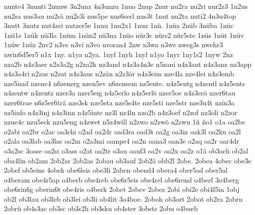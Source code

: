 {    nunte4
    3nunti
    2nunw
    3n2unz
    4n3unzu
    1nuo
    2nup
    2nur
    nu2ra
    nu2ri
    nur2z3
    1n2us
    nu2sa
    nus3au
    nu2sä
    nu2s3i
    nus5pe
    nus6serl
    nus3t
    1nut
    nu2ta
    nuti2
    4n3u4top
    3nutt
    3nutz
    nut4zei
    nutzer5e
    1nuu
    1nu2x1
    1nuz
    1nü.
    1nüa
    2nüb
    3nüba
    1nüc
    1nü1e
    1nük
    nü3la
    1nüm
    1nün2
    nü3na
    1nüo
    nür3c
    nürs2
    nür5ste
    1nüs
    1nüt
    1nüv
    1nüw
    1nüz
    2nv2
    n3ve
    n3vi
    n3vo
    nvoran4
    2nw
    n3wa
    n3we
    nweg3s
    nwehr3
    nwin6d5er5
    n1x
    1ny.
    n1ya
    n2ya.
    1nyf
    1nyh
    1nyl
    n1yo
    1nyr
    1ny1s2
    1nyw
    2nz
    nza2b
    n4z3aer
    n2z3a2g
    n2za2k
    nz3and
    n4z3a4n3e
    n5zani
    n4z3ant
    n4z3anz
    nz3app
    n4z3a4ri
    n2zas
    n2zat
    n4z3aus
    n2zän
    n2z3är
    n4z3eim
    nze4la
    nze4lei
    n4z3emb
    nze5nad
    nzene4
    n6zenerg
    nzen5ev
    n6zensem
    nz5ente.
    n4z5entg
    n4zentl
    n4z5ents
    n4zentw
    n4zentz
    nzer3a
    nzer5eig
    n4z5erlo
    n4z5erlö
    nzer5oe
    n4z3erö
    nzer6tau
    nzer6trae
    n6z5er6trä
    nze3sk
    nze5sta
    nze5s4te
    nze5sti
    nze5str
    nze3u4t
    nzin3a
    nz5info
    n4z3inj
    n4z3inn
    n4z5inte
    nz3l
    nz4ln
    nzo2b
    n4z3oef
    n2zof
    nz3oli
    n2zor
    nzue4c
    nzu5eck
    nzu5eng
    n4zwet
    n5z4will
    n2zwo
    n2zwö
    n2zwu
    1ñ
    ño1
    o1a
    oa2be
    o2abi
    oa2br
    o2ac
    oa3chi
    o2ad
    oa2dr
    oad3ra
    oad3t
    oa2g
    oa3in
    oak3l
    oa2ku
    oa2l
    o2ala
    oa3lab
    oa3las
    oa2m
    o2a3mi
    oampe4
    oa2n
    oana3
    oan3e
    o2aq
    oa2r
    oar4dr
    o3a2sc
    3oase
    oa2si
    o3ass
    o2at
    oa2tr
    o3au
    oauf3
    oa2v
    oa2x
    oa2z
    o1ä
    ob3ach
    ob2al
    oba4lin
    ob2am
    2ob2ar
    2ob2as
    2obau
    ob3auf
    2ob2ä
    obb2l
    2obe.
    2obea
    4obec
    obe3e
    2obef
    ob5eins
    4obek
    obe6leis
    obe3li
    2oben
    obend4
    obera4
    ober5ad
    ober5al
    o4beram
    obe4r5ap
    o4berb
    obe4reb
    obe6r5eis
    obe4rel
    obe6rend
    o4berf
    3o4berg
    obe6rin6g
    oberin6t
    obe4ris
    o4berk
    2obet
    2obev
    2obez
    2obi
    obi2e
    obi4l5in
    1obj
    ob2l
    ob3lau
    ob3leb
    ob3lei
    ob3li
    ob4lit
    3o4boe.
    2oboh
    ob3ort
    2obot
    ob2ra
    2obru
    2obrü
    ob4s3ac
    ob3sc
    ob3s2h
    ob3sku
    ob4ster
    3obsts
    2obu
    o4bueb
}
